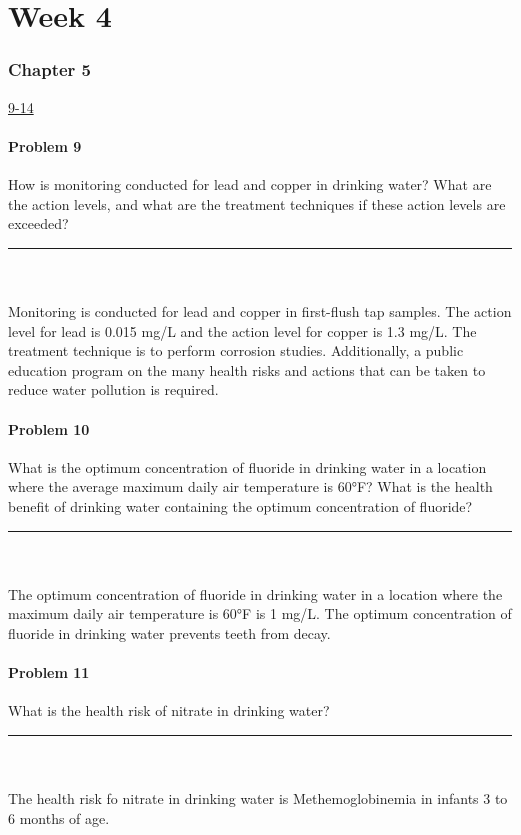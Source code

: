 \part*{Week 4}
\section*{Chapter 5}
\underline{9-14}
\subsection*{Problem 9}
How is monitoring conducted for lead and copper in drinking water? What are the action levels, and what are the treatment techniques if these action levels are exceeded?
\\\rule{5cm}{1pt}
\\\\Monitoring is conducted for lead and copper in first-flush tap samples. The action level for lead is 0.015 mg/L and the action level for copper is 1.3 mg/L. The treatment technique is to perform corrosion studies. Additionally, a public education program on the many health risks and actions that can be taken to reduce water pollution is required.
\subsection*{Problem 10}
What is the optimum concentration of fluoride in drinking water in a location where the average maximum daily air temperature is 60°F? What is the health benefit of drinking water containing the optimum concentration of fluoride?
\\\rule{5cm}{1pt}
\\\\The optimum concentration of fluoride in drinking water in a location where the maximum daily air temperature is 60°F is 1 mg/L. The optimum concentration of fluoride in drinking water prevents teeth from decay. 
\subsection*{Problem 11}
What is the health risk of nitrate in drinking water?
\\\rule{5cm}{1pt}
\\\\The health risk fo nitrate in drinking water is Methemoglobinemia in infants 3 to 6 months of age.
